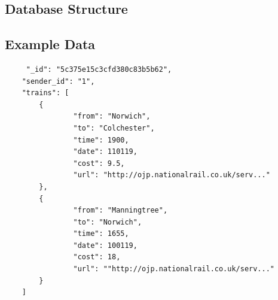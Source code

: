 \documentclass[12pt,a4paper]{article}
\begin{document}
    \begin{appendices}
    \section{Database Structure}
    \label{appendix:db_structure}
    \subsection{Example Data}
    \label{appendix_subsection:db_example_data}
    \begin{lstlisting}
     "_id": "5c375e15c3cfd380c83b5b62",
    "sender_id": "1",
    "trains": [
        {
                "from": "Norwich",
                "to": "Colchester",
                "time": 1900,
                "date": 110119,
                "cost": 9.5,
                "url": "http://ojp.nationalrail.co.uk/serv..."
        },
        {
                "from": "Manningtree",
                "to": "Norwich",
                "time": 1655,
                "date": 100119,
                "cost": 18,
                "url": ""http://ojp.nationalrail.co.uk/serv..."
        }
    ]
    \end{lstlisting}
    \end{appendices}
    
\end{document}
